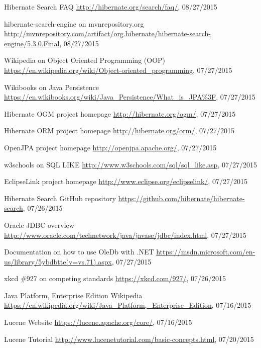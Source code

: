 \begin{thebibliography}{99}
	Hibernate Search FAQ
	\url{http://hibernate.org/search/faq/}, 08/27/2015
	
	hibernate-search-engine on mvnrepository.org
	\url{http://mvnrepository.com/artifact/org.hibernate/hibernate-search-engine/5.3.0.Final}, 08/27/2015
	
	Wikipedia on Object Oriented Programming (OOP)
	\url{https://en.wikipedia.org/wiki/Object-oriented_programming}, 07/27/2015
	
	Wikibooks on Java Persistence
	\url{https://en.wikibooks.org/wiki/Java_Persistence/What_is_JPA\%3F}, 07/27/2015
	
	Hibernate OGM project homepage
	\url{http://hibernate.org/ogm/}, 07/27/2015
	
	Hibernate ORM project homepage
	\url{http://hibernate.org/orm/}, 07/27/2015
	
	OpenJPA project homepage
	\url{http://openjpa.apache.org/}, 07/27/2015
	
	w3schools on SQL LIKE
	\url{http://www.w3schools.com/sql/sql_like.asp}, 07/27/2015
	
	EclipseLink project homepage
	\url{http://www.eclipse.org/eclipselink/}, 07/27/2015
	
	Hibernate Search GitHub repository
	\url{https://github.com/hibernate/hibernate-search}, 07/26/2015
	
	Oracle JDBC overview
	\url{http://www.oracle.com/technetwork/java/javase/jdbc/index.html}, 07/27/2015
	
	Documentation on how to use OleDb with .NET
	\url{https://msdn.microsoft.com/en-us/library/5ybdbtte(v=vs.71).aspx}, 07/27/2015
	
	xkcd \#927 on competing standards
	\url{https://xkcd.com/927/}, 07/26/2015
	
	Java Platform, Enterprise Edition
	Wikipedia
	\url{https://en.wikipedia.org/wiki/Java_Platform,_Enterprise_Edition}, 07/16/2015
	
	Lucene Website
	\url{https://lucene.apache.org/core/}, 07/16/2015
	
	Lucene Tutorial
	\url{http://www.lucenetutorial.com/basic-concepts.html}, 07/20/2015
	

\end{thebibliography}
